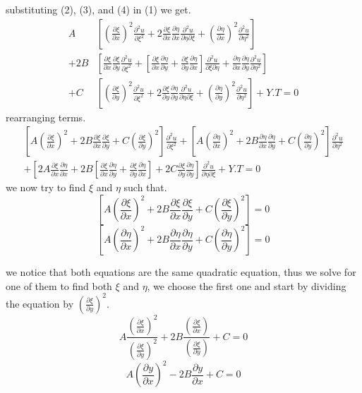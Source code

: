 \documentclass[]{article}
\begin{document}
substituting (2), (3), and (4) in (1) we get.
\begin{align*}
       A&\left[{(\frac{\partial\xi}{\partial x})}^2\frac{\partial^2 u}{\partial\xi^2}+2\frac{\partial\xi}{\partial x}\frac{\partial\eta}{\partial x}\frac{\partial^2 u}{\partial\eta\partial\xi}+{(\frac{\partial\eta}{\partial x})}^2\frac{\partial^2 u}{\partial\eta^2}\right]
    \\ +2B&\left[\frac{\partial\xi}{\partial x}\frac{\partial\xi}{\partial y}\frac{\partial^2 u}{\partial\xi^2}+\left[\frac{\partial\xi}{\partial x}\frac{\partial\eta}{\partial y}+\frac{\partial\xi}{\partial y}\frac{\partial\eta}{\partial x}\right]\frac{\partial^2 u}{\partial\xi\partial\eta}+\frac{\partial\eta}{\partial x}\frac{\partial\eta}{\partial y}\frac{\partial^2 u}{\partial\eta^2}\right] 
    \\ +C&\left[{(\frac{\partial\xi}{\partial y})}^2\frac{\partial^2 u}{\partial\xi^2}+2\frac{\partial\xi}{\partial y}\frac{\partial\eta}{\partial y}\frac{\partial^2 u}{\partial\eta\partial\xi}+{(\frac{\partial\eta}{\partial y})}^2\frac{\partial^2 u}{\partial\eta^2}\right]+Y.T =0    
\end{align*}
rearranging terms.
\begin{align*}
\left[A{(\frac{\partial\xi}{\partial x})}^2+2B\frac{\partial\xi}{\partial x}\frac{\partial\xi}{\partial y}+C{(\frac{\partial\xi}{\partial y})}^2\right]\frac{\partial^2 u}{\partial\xi^2}+\left[A{(\frac{\partial\eta}{\partial x})}^2+2B\frac{\partial\eta}{\partial x}\frac{\partial\eta}{\partial y}+C{(\frac{\partial\eta}{\partial y})}^2\right]\frac{\partial^2 u}{\partial\eta^2}\\
+\left[2A\frac{\partial\xi}{\partial x}\frac{\partial\eta}{\partial x}+2B\left[\frac{\partial\xi}{\partial x}\frac{\partial\eta}{\partial y}+\frac{\partial\xi}{\partial y}\frac{\partial\eta}{\partial x}\right]+2C\frac{\partial\xi}{\partial y}\frac{\partial\eta}{\partial y}\right]\frac{\partial^2 u}{\partial\eta\partial\xi}+Y.T=0
\end{align*}
we now try to find $\xi$ and $\eta$ such that.
\[
    \left[A{(\frac{\partial\xi}{\partial x})}^2+2B\frac{\partial\xi}{\partial x}\frac{\partial\xi}{\partial y}+C{(\frac{\partial\xi}{\partial y})}^2\right] =0    
\]
\[
    \left[A{(\frac{\partial\eta}{\partial x})}^2+2B\frac{\partial\eta}{\partial x}\frac{\partial\eta}{\partial y}+C{(\frac{\partial\eta}{\partial y})}^2\right]=0    
\]

we notice that both equations are the same quadratic equation, thus we solve for one of them to find both $\xi$ and $\eta$, we choose the first one and start by dividing the equation by ${(\frac{\partial\xi}{\partial y})}^2$.
\[
    A\frac{{(\frac{\partial\xi}{\partial x})}^2}{{(\frac{\partial\xi}{\partial y})}^2}+2B\frac{\left(\frac{\partial\xi}{\partial x}\right)}{\left(\frac{\partial\xi}{\partial y}\right)}+C =0    
\]
\[
    A{(\frac{\partial y}{\partial x})}^2-2B\frac{\partial y}{\partial x}+C =0    
\]
\end{document}
